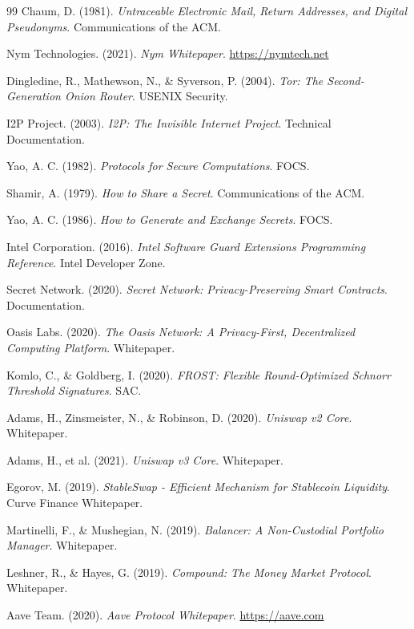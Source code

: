 \documentclass[11pt,a4paper,twoside]{book}
\begin{document}
\begin{thebibliography}{99}
 Chaum, D. (1981). \textit{Untraceable Electronic Mail, Return Addresses, and Digital Pseudonyms}. Communications of the ACM.

 Nym Technologies. (2021). \textit{Nym Whitepaper}. \url{https://nymtech.net}

 Dingledine, R., Mathewson, N., \& Syverson, P. (2004). \textit{Tor: The Second-Generation Onion Router}. USENIX Security.

 I2P Project. (2003). \textit{I2P: The Invisible Internet Project}. Technical Documentation.

 Yao, A. C. (1982). \textit{Protocols for Secure Computations}. FOCS.

 Shamir, A. (1979). \textit{How to Share a Secret}. Communications of the ACM.

 Yao, A. C. (1986). \textit{How to Generate and Exchange Secrets}. FOCS.

 Intel Corporation. (2016). \textit{Intel Software Guard Extensions Programming Reference}. Intel Developer Zone.

 Secret Network. (2020). \textit{Secret Network: Privacy-Preserving Smart Contracts}. Documentation.

 Oasis Labs. (2020). \textit{The Oasis Network: A Privacy-First, Decentralized Computing Platform}. Whitepaper.

 Komlo, C., \& Goldberg, I. (2020). \textit{FROST: Flexible Round-Optimized Schnorr Threshold Signatures}. SAC.


 Adams, H., Zinsmeister, N., \& Robinson, D. (2020). \textit{Uniswap v2 Core}. Whitepaper.

 Adams, H., et al. (2021). \textit{Uniswap v3 Core}. Whitepaper.

 Egorov, M. (2019). \textit{StableSwap - Efficient Mechanism for Stablecoin Liquidity}. Curve Finance Whitepaper.

 Martinelli, F., \& Mushegian, N. (2019). \textit{Balancer: A Non-Custodial Portfolio Manager}. Whitepaper.

 Leshner, R., \& Hayes, G. (2019). \textit{Compound: The Money Market Protocol}. Whitepaper.

 Aave Team. (2020). \textit{Aave Protocol Whitepaper}. \url{https://aave.com}


\end{thebibliography}
\end{document}
